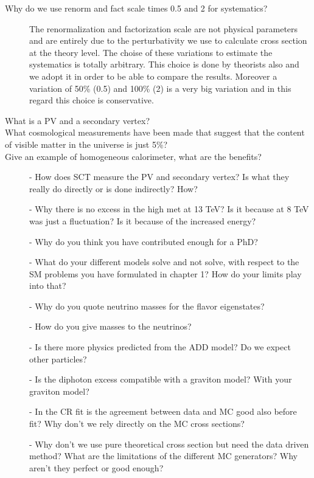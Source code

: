 \documentclass[a4paper,10pt,twoside,notitlepage]{article}
\begin{document}
\begin{description}
\item[Why do we use renorm and fact scale times 0.5 and 2 for systematics?] The
  renormalization and factorization scale are not physical parameters and are
  entirely due to the perturbativity we use to calculate cross section at the
  theory level. The choise of these variations to estimate the systematics is
  totally arbitrary. This choice is done by theorists also and we adopt it in
  order to be able to compare the results. Moreover a variation of 50\% (0.5)
  and 100\% (2) is a very big variation and in this regard this choice is
  conservative.

\item[What is a PV and a secondary vertex?]

\item[What cosmological measurements have been made that suggest that the
  content of visible matter in the universe is just 5\%?]

\item[Give an example of homogeneous calorimeter, what are the benefits?]


  - How does SCT measure the PV and secondary vertex? Is what they really do
  directly or is done indirectly? How?

  - Why there is no excess in the high met at 13 TeV? Is it because at 8 TeV was
  just a fluctuation? Is it because of the increased energy?

  - Why do you think you have contributed enough for a PhD?

  - What do your different models solve and not solve, with respect to the SM
  problems you have formulated in chapter 1? How do your limits play into that?

  - Why do you quote neutrino masses for the flavor eigenstates?

  - How do you give masses to the neutrinos?

  - Is there more physics predicted from the ADD model? Do we expect other
  particles?

  - Is the diphoton excess compatible with a graviton model? With your graviton
  model?

  - In the CR fit is the agreement between data and MC good also before fit? Why
  don't we rely directly on the MC cross sections?

  - Why don't we use pure theoretical cross section but need the data driven
  method? What are the limitations of the different MC generators? Why aren't
  they perfect or good enough?


\end{description}
\end{document}
